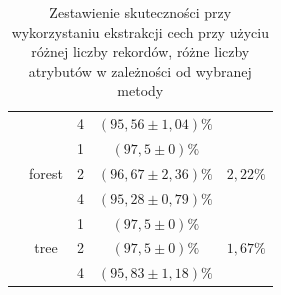 \begin{table}[]
\begin{tabular}{|c|c|c|c|c|}
                      &                         & 4                & $ (95,56 \pm 1,04) \% $  & \\ \cline{2-5} 
                      & \multirow{3}{*}{forest} & 1                & $ (97,5 \pm 0) \% $       & \multirow{3}{*}{$2,22\%$} \\ \cline{3-4} 
                      &                         & 2                & $ (96,67 \pm 2,36) \% $   &\\ \cline{3-4} 
                      &                         & 4                & $ (95,28 \pm 0,79) \% $  & \\ \cline{2-5} 
                      & \multirow{3}{*}{tree}   & 1                & $ (97,5 \pm 0) \% $       & \multirow{3}{*}{$1,67\%$} \\ \cline{3-4} 
                      &                         & 2                & $ (97,5 \pm 0) \% $       &\\ \cline{3-4} 
                      &                         & 4                & $ (95,83 \pm 1,18) \% $   &\\ \hline
\end{tabular}
\caption{Zestawienie skuteczności przy wykorzystaniu ekstrakcji cech przy użyciu różnej liczby rekordów, różne liczby atrybutów w zależności od wybranej metody}
\label{table:fxTable}

\end{table}

